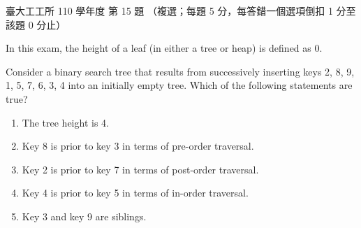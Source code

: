 \begin{pastexam}[label={px:ntu-110-ie-ds-15}]{臺大工工所 110 學年度 第 15 題}
（複選；每題 5 分，每答錯一個選項倒扣 1 分至該題 0 分止）

In this exam, the height of a leaf (in either a tree or heap) is defined as 0.

Consider a binary search tree that results from successively inserting keys 2, 8, 9, 1, 5, 7, 6, 3, 4
into an initially empty tree. Which of the following statements are true?
\begin{enumerate}[label=(\Alph*)]
\item The tree height is 4.
\item Key 8 is prior to key 3 in terms of pre-order traversal.
\item Key 2 is prior to key 7 in terms of post-order traversal.
\item Key 4 is prior to key 5 in terms of in-order traversal.
\item Key 3 and key 9 are siblings.
\end{enumerate}
\end{pastexam}

